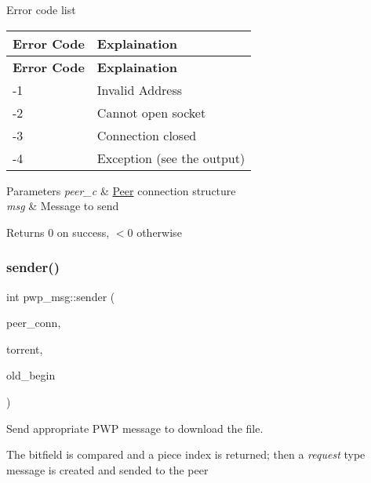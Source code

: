 Error code list

\tabulinesep=1mm
\begin{longtabu} spread 0pt [c]{*{2}{|X[-1]}|}
\hline
\rowcolor{\tableheadbgcolor}\textbf{ Error Code }&\textbf{ Explaination  }\\
\endfirsthead
\hline
\endfoot
\hline
\rowcolor{\tableheadbgcolor}\textbf{ Error Code }&\textbf{ Explaination  }\\
\endhead
-\/1 &Invalid Address \\
-\/2 &Cannot open socket \\
-\/3 &Connection closed \\
-\/4 &Exception (see the output) \\
\end{longtabu}

\begin{DoxyParams}{Parameters}
{\em peer\+\_\+c} & \hyperlink{classPeer}{Peer} connection structure \\
\hline
{\em msg} & Message to send \\
\hline
\end{DoxyParams}
\begin{DoxyReturn}{Returns}
0 on success, $<$0 otherwise 
\end{DoxyReturn}
\mbox{\label{namespacepwp__msg_ab578b213d293636d33efc24382f16b25}} 
\subsubsection{\texorpdfstring{sender()}{sender()}}
{\footnotesize\ttfamily int pwp\+\_\+msg\+::sender (\begin{DoxyParamCaption}\item[{\hyperlink{structpwp_1_1peer__connection}{pwp\+::peer\+\_\+connection} \&}]{peer\+\_\+conn,  }\item[{\hyperlink{structtorr_1_1Torrent}{Torrent} \&}]{torrent,  }\item[{int \&}]{old\+\_\+begin }\end{DoxyParamCaption})}



Send appropriate P\+WP message to download the file. 

The bitfield is compared and a piece index is returned; then a {\itshape request} type message is created and sended to the peer


